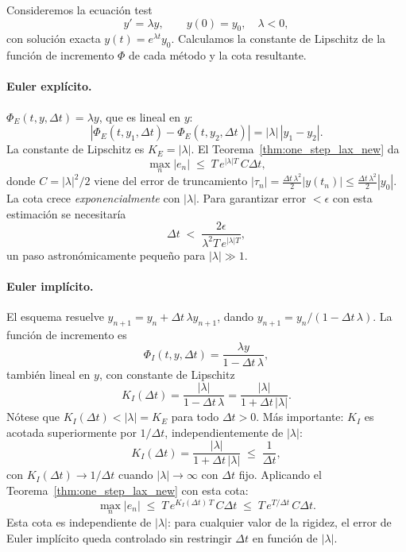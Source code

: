 \documentclass[a4paper,11pt]{report}
\begin{document}
Consideremos la ecuación test
\[
  y'=\lambda y,\qquad y(0)=y_0,\quad \lambda<0,
\]
con solución exacta $y(t)=e^{\lambda t}y_0$. Calculamos la constante de Lipschitz de la función de incremento $\Phi$ de cada método y la cota resultante.

\paragraph{Euler explícito.}
$\Phi_E(t,y,\Delta t)=\lambda y$, que es lineal en $y$:
\[
  |\Phi_E(t,y_1,\Delta t)-\Phi_E(t,y_2,\Delta t)|=|\lambda|\,|y_1-y_2|.
\]
La constante de Lipschitz es $K_E=|\lambda|$. El Teorema~\ref{thm:one_step_lax_new} da
\[
  \max_n|e_n|\;\le\;T\,e^{|\lambda|T}\,C\Delta t,
\]
donde $C=|\lambda|^2/2$ viene del error de truncamiento $|\tau_n|=\frac{\Delta t\,\lambda^2}{2}|y(t_n)|\le\frac{\Delta t\,\lambda^2}{2}|y_0|$. La cota crece \emph{exponencialmente} con $|\lambda|$. Para garantizar error $<\epsilon$ con esta estimación se necesitaría
\[
  \Delta t\;<\;\frac{2\epsilon}{\lambda^2 T\,e^{|\lambda|T}},
\]
un paso astronómicamente pequeño para $|\lambda|\gg1$.

\paragraph{Euler implícito.}
El esquema resuelve $y_{n+1}=y_n+\Delta t\,\lambda y_{n+1}$, dando $y_{n+1}=y_n/(1-\Delta t\,\lambda)$. La función de incremento es
\[
  \Phi_I(t,y,\Delta t)=\frac{\lambda y}{1-\Delta t\,\lambda},
\]
también lineal en $y$, con constante de Lipschitz
\[
  K_I(\Delta t)=\frac{|\lambda|}{1-\Delta t\,\lambda}=\frac{|\lambda|}{1+\Delta t\,|\lambda|}.
\]
Nótese que $K_I(\Delta t)<|\lambda|=K_E$ para todo $\Delta t>0$. Más importante: $K_I$ es acotada superiormente por $1/\Delta t$, independientemente de $|\lambda|$:
\[
  K_I(\Delta t)=\frac{|\lambda|}{1+\Delta t\,|\lambda|}\;\le\;\frac{1}{\Delta t},
\]
con $K_I(\Delta t)\to 1/\Delta t$ cuando $|\lambda|\to\infty$ con $\Delta t$ fijo. Aplicando el Teorema~\ref{thm:one_step_lax_new} con esta cota:
\[
  \max_n|e_n|\;\le\;T\,e^{K_I(\Delta t)\,T}\,C\Delta t\;\le\;T\,e^{T/\Delta t}\,C\Delta t.
\]
Esta cota es independiente de $|\lambda|$: para cualquier valor de la rigidez, el error de Euler implícito queda controlado sin restringir $\Delta t$ en función de $|\lambda|$.
\end{document}
